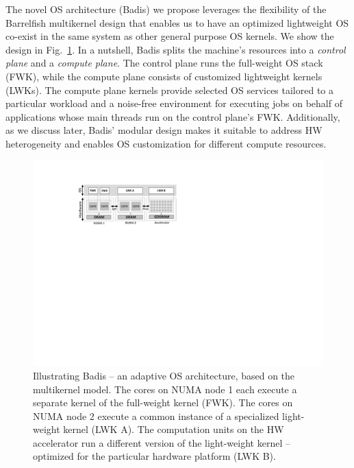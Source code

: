 \documentclass[11pt]{article}
\begin{document}
The novel OS architecture (Badis) we propose leverages the flexibility of the Barrelfish multikernel 
design that enables us to have an optimized lightweight OS co-exist in the same system as 
other general purpose OS kernels. We show the design in Fig.~\ref{fig:basslet}. In a nutshell, Badis
splits the machine's resources into a {\it control plane} and a {\it compute plane}. The control 
plane runs the full-weight OS stack (FWK), while the compute plane consists of customized lightweight
kernels (LWKs). The compute plane kernels provide selected OS services tailored to a particular 
workload and a noise-free environment for executing jobs on behalf of applications whose main threads run on the control plane's FWK. Additionally, as we discuss later, Badis' modular design makes it suitable 
to address HW heterogeneity and enables OS customization for different compute resources.

\begin{figure}
  \centering
  \includegraphics[trim=4cm 14cm 14cm 2.5cm, clip=true]
    {figs/multi-kernel}
  \caption{Illustrating Badis -- an adaptive OS architecture, based on the multikernel model.
  The cores on NUMA node 1 each execute a separate kernel of the full-weight kernel (FWK). The 
  cores on NUMA node 2 execute a common instance of a specialized light-weight kernel (LWK A).
  The computation units on the HW accelerator run a different version of the light-weight 
  kernel -- optimized for the particular hardware platform (LWK B).
  }
  \label{fig:basslet}
\end{figure}
\end{document}
